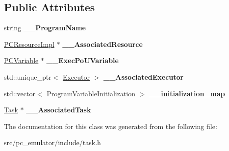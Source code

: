 \subsection*{Public Attributes}
\begin{DoxyCompactItemize}
\item 
string {\bfseries \+\_\+\+\_\+\+Program\+Name}\hypertarget{classpc__emulator_1_1ProgramContainer_a4802e6bb9c3ecb81eb8e9a2f1d774717}{}\label{classpc__emulator_1_1ProgramContainer_a4802e6bb9c3ecb81eb8e9a2f1d774717}

\item 
\hyperlink{classpc__emulator_1_1PCResourceImpl}{P\+C\+Resource\+Impl} $\ast$ {\bfseries \+\_\+\+\_\+\+Associated\+Resource}\hypertarget{classpc__emulator_1_1ProgramContainer_a81deac7cc354b8017e866a81772ee74e}{}\label{classpc__emulator_1_1ProgramContainer_a81deac7cc354b8017e866a81772ee74e}

\item 
\hyperlink{classpc__emulator_1_1PCVariable}{P\+C\+Variable} $\ast$ {\bfseries \+\_\+\+\_\+\+Exec\+Po\+U\+Variable}\hypertarget{classpc__emulator_1_1ProgramContainer_a4e4a3eaf4ff33ecda9b29881e69848b4}{}\label{classpc__emulator_1_1ProgramContainer_a4e4a3eaf4ff33ecda9b29881e69848b4}

\item 
std\+::unique\+\_\+ptr$<$ \hyperlink{classpc__emulator_1_1Executor}{Executor} $>$ {\bfseries \+\_\+\+\_\+\+Associated\+Executor}\hypertarget{classpc__emulator_1_1ProgramContainer_ae52a4c7a3782a25a1ef260e56b30299a}{}\label{classpc__emulator_1_1ProgramContainer_ae52a4c7a3782a25a1ef260e56b30299a}

\item 
std\+::vector$<$ Program\+Variable\+Initialization $>$ {\bfseries \+\_\+\+\_\+initialization\+\_\+map}\hypertarget{classpc__emulator_1_1ProgramContainer_ab7538eadd8f759f55050527fca0f4330}{}\label{classpc__emulator_1_1ProgramContainer_ab7538eadd8f759f55050527fca0f4330}

\item 
\hyperlink{classpc__emulator_1_1Task}{Task} $\ast$ {\bfseries \+\_\+\+\_\+\+Associated\+Task}\hypertarget{classpc__emulator_1_1ProgramContainer_a8cce112891b05be67ee6127423b634d4}{}\label{classpc__emulator_1_1ProgramContainer_a8cce112891b05be67ee6127423b634d4}

\end{DoxyCompactItemize}


The documentation for this class was generated from the following file\+:\begin{DoxyCompactItemize}
\item 
src/pc\+\_\+emulator/include/task.\+h\end{DoxyCompactItemize}
